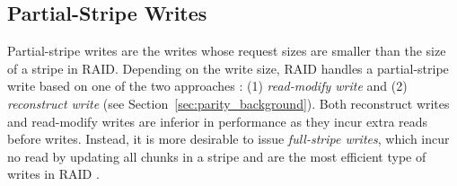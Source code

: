 




\subsection{Partial-Stripe Writes}


Partial-stripe writes are the writes whose request sizes are smaller than the
size of a stripe in RAID.  Depending on the write size, RAID handles a 
partial-stripe write based on one of the two approaches \cite{chen95}: (1)
\textit{read-modify write} and (2) \textit{reconstruct write} (see
Section~\ref{sec:parity_background}).  Both
reconstruct writes and read-modify writes are inferior in performance as they
incur extra reads before writes.  Instead, it is more desirable to issue 
{\em full-stripe writes}, which incur no read by updating all chunks in a stripe 
and are the most efficient type of writes in RAID \cite{chen95}. 

